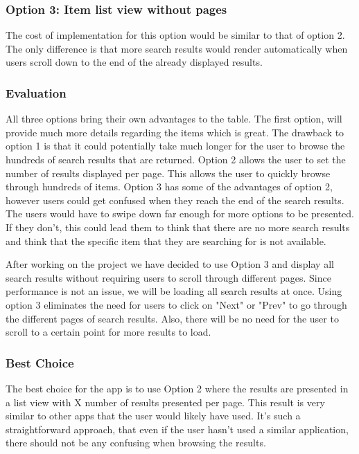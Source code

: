 \documentclass[journal,compsoc, 10pt, draftclsnofoot, onecolumn]{IEEEtran}
\begin{document}
\subsubsection*{Option 3: Item list view without pages}
The cost of implementation for this option would be similar to that of option 2. 
The only difference is that more search results would render automatically when 
users scroll down to the end of the already displayed results. 

\subsubsection*{Evaluation}
All three options bring their own advantages to the table. The first option, will 
provide much more details regarding the items which is great. The drawback to 
option 1 is that it could potentially take much longer for the user to browse the 
hundreds of search results that are returned. Option 2 allows the user to set the 
number of results displayed per page. This allows the user to quickly browse through 
hundreds of items. Option 3 has some of the advantages of option 2, however users 
could get confused when they reach the end of the search results. The users would 
have to swipe down far enough for more options to be presented. If they don't, this 
could lead them to think that there are no more search results and think that the 
specific item that they are searching for is not available. 

After working on the project we have decided to use Option 3 and display all 
search results without requiring users to scroll through different pages. 
Since performance is not an issue, we will be loading all search results at 
once. Using option 3 eliminates the need for users to click on 
"Next" or "Prev" to go through the different pages of search results. Also, 
there will be no need for the user to scroll to a certain point for more 
results to load. 

\subsubsection*{Best Choice}
The best choice for the app is to use Option 2 where the results are presented in 
a list view with X number of results presented per page. This result is very 
similar to other apps that the user would likely have used. It's such a 
straightforward approach, that even if the user hasn't used a similar 
application, there should not be any confusing when browsing the results. 
\end{document}
